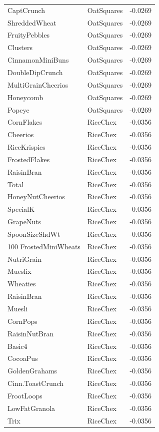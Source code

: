 \begin{longtable}{llr}
CaptCrunch & OatSquares & -0.0269 \\
ShreddedWheat & OatSquares & -0.0269 \\
FruityPebbles & OatSquares & -0.0269 \\
Clusters & OatSquares & -0.0269 \\
CinnamonMiniBuns & OatSquares & -0.0269 \\
DoubleDipCrunch & OatSquares & -0.0269 \\
MultiGrainCheerios & OatSquares & -0.0269 \\
Honeycomb & OatSquares & -0.0269 \\
Popeye & OatSquares & -0.0269 \\
CornFlakes & RiceChex & -0.0356 \\
Cheerios & RiceChex & -0.0356 \\
RiceKrispies & RiceChex & -0.0356 \\
FrostedFlakes & RiceChex & -0.0356 \\
RaisinBran & RiceChex & -0.0356 \\
Total & RiceChex & -0.0356 \\
HoneyNutCheerios & RiceChex & -0.0356 \\
SpecialK & RiceChex & -0.0356 \\
GrapeNuts & RiceChex & -0.0356 \\
SpoonSizeShdWt & RiceChex & -0.0356 \\
100%
FrostedMiniWheats & RiceChex & -0.0356 \\
NutriGrain & RiceChex & -0.0356 \\
Mueslix & RiceChex & -0.0356 \\
Wheaties & RiceChex & -0.0356 \\
RaisinBran & RiceChex & -0.0356 \\
Muesli & RiceChex & -0.0356 \\
CornPops & RiceChex & -0.0356 \\
RaisinNutBran & RiceChex & -0.0356 \\
Basic4 & RiceChex & -0.0356 \\
CocoaPus & RiceChex & -0.0356 \\
GoldenGrahams & RiceChex & -0.0356 \\
Cinn.ToastCrunch & RiceChex & -0.0356 \\
FrootLoops & RiceChex & -0.0356 \\
LowFatGranola & RiceChex & -0.0356 \\
Trix & RiceChex & -0.0356 \\

\end{longtable}
